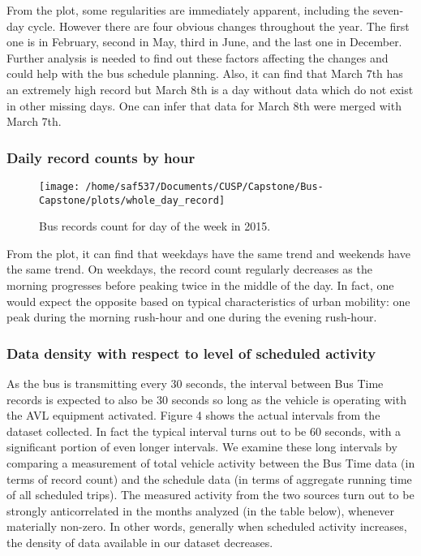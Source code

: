 \documentclass[12pt,journal,compsoc]{IEEEtran}
\begin{document}
From the plot, some regularities are immediately apparent, including the seven-day cycle. However there are four obvious changes throughout the year. The first one is in February, second in May, third in June, and the last one in December. Further analysis is needed to find out these factors affecting the changes and could help with the bus schedule planning. Also, it can find that March 7th has an extremely high record but March 8th is a day without data which do not exist in other missing days. One can infer that data for March 8th were merged with March 7th.
      
      \subsubsection*{Daily record counts by hour}
      

\begin{figure}[!ht]
	\label{week}
  \caption{Bus records count for day of the week in 2015.}
  \centering
    \texttt{[image: /home/saf537/Documents/CUSP/Capstone/Bus-Capstone/plots/whole\_day\_record]}
\end{figure}

From the plot, it can find that weekdays have the same trend and weekends have the same trend.   On weekdays, the record count regularly decreases as the morning progresses before peaking twice in the middle of the day.  In fact, one would expect the opposite based on typical characteristics of urban mobility: one peak during the morning rush-hour and one during the evening rush-hour.


      \subsubsection*{Data density with respect to level of scheduled activity}
      
       
   As the bus is transmitting every 30 seconds, the interval between Bus Time records is expected to also be 30 seconds so long as the vehicle is operating with the AVL equipment activated.  Figure 4 shows the actual intervals from the dataset collected.  In fact the typical interval turns out to be 60 seconds, with a significant portion of even longer intervals.  We examine these long intervals by comparing a measurement of total vehicle activity between the Bus Time data (in terms of record count) and the schedule data (in terms of aggregate running time of all scheduled trips). The measured activity from the two sources turn out to be strongly anticorrelated in the months analyzed (in the table below), whenever materially non-zero.  In other words, generally when scheduled activity increases, the density of data available in our dataset decreases.
\end{document}
